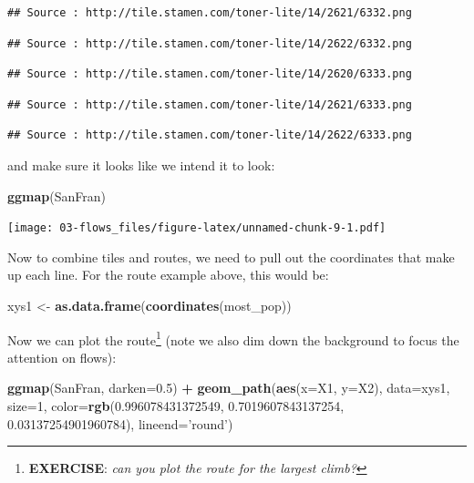\documentclass[]{book}
\newenvironment{Shaded}{\begin{snugshade}}{\end{snugshade}}
\newcommand{\KeywordTok}[1]{\textcolor[rgb]{0.13,0.29,0.53}{\textbf{#1}}}
\newcommand{\DataTypeTok}[1]{\textcolor[rgb]{0.13,0.29,0.53}{#1}}
\newcommand{\DecValTok}[1]{\textcolor[rgb]{0.00,0.00,0.81}{#1}}
\newcommand{\FloatTok}[1]{\textcolor[rgb]{0.00,0.00,0.81}{#1}}
\newcommand{\StringTok}[1]{\textcolor[rgb]{0.31,0.60,0.02}{#1}}
\newcommand{\OperatorTok}[1]{\textcolor[rgb]{0.81,0.36,0.00}{\textbf{#1}}}
\newcommand{\NormalTok}[1]{#1}
\begin{document}
\begin{verbatim}
## Source : http://tile.stamen.com/toner-lite/14/2621/6332.png
\end{verbatim}

\begin{verbatim}
## Source : http://tile.stamen.com/toner-lite/14/2622/6332.png
\end{verbatim}

\begin{verbatim}
## Source : http://tile.stamen.com/toner-lite/14/2620/6333.png
\end{verbatim}

\begin{verbatim}
## Source : http://tile.stamen.com/toner-lite/14/2621/6333.png
\end{verbatim}

\begin{verbatim}
## Source : http://tile.stamen.com/toner-lite/14/2622/6333.png
\end{verbatim}

and make sure it looks like we intend it to look:

\begin{Shaded}
\begin{Highlighting}[]
\KeywordTok{ggmap}\NormalTok{(SanFran)}
\end{Highlighting}
\end{Shaded}

\texttt{[image: 03-flows\_files/figure-latex/unnamed-chunk-9-1.pdf]}

Now to combine tiles and routes, we need to pull out the coordinates
that make up each line. For the route example above, this would be:

\begin{Shaded}
\begin{Highlighting}[]
\NormalTok{xys1 <-}\StringTok{ }\KeywordTok{as.data.frame}\NormalTok{(}\KeywordTok{coordinates}\NormalTok{(most_pop))}
\end{Highlighting}
\end{Shaded}

Now we can plot the route\footnote{\textbf{EXERCISE}: \emph{can you plot
  the route for the largest climb?}} (note we also dim down the
background to focus the attention on flows):

\begin{Shaded}
\begin{Highlighting}[]
\KeywordTok{ggmap}\NormalTok{(SanFran, }\DataTypeTok{darken=}\FloatTok{0.5}\NormalTok{) }\OperatorTok{+}\StringTok{ }
\StringTok{  }\KeywordTok{geom_path}\NormalTok{(}\KeywordTok{aes}\NormalTok{(}\DataTypeTok{x=}\NormalTok{X1, }\DataTypeTok{y=}\NormalTok{X2), }
            \DataTypeTok{data=}\NormalTok{xys1,}
            \DataTypeTok{size=}\DecValTok{1}\NormalTok{,}
            \DataTypeTok{color=}\KeywordTok{rgb}\NormalTok{(}\FloatTok{0.996078431372549}\NormalTok{, }\FloatTok{0.7019607843137254}\NormalTok{, }\FloatTok{0.03137254901960784}\NormalTok{),}
            \DataTypeTok{lineend=}\StringTok{'round'}\NormalTok{)}
\end{Highlighting}
\end{Shaded}
\end{document}
